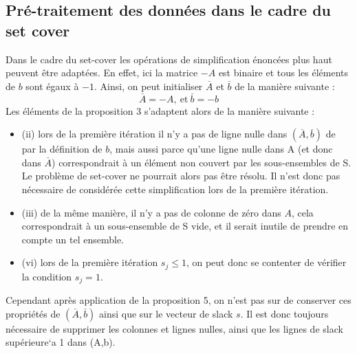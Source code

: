 \documentclass[12pt]{report}
\begin{document}
\subsection{Pré-traitement des données dans le cadre du set cover}

Dans le cadre du set-cover les opérations de simplification énoncées plus haut peuvent être adaptées. En effet, ici la matrice $-A$ est binaire et tous les éléments de $b$ sont égaux à $-1$. Ainsi, on peut initialiser $\overset{\_}{A}$ et $\overset{\_}{b}$ de la manière suivante :
$$
\overset{\_}{A}=-A, \ \mbox{et} \ \overset{\_}{b}=-b
$$
Les éléments de la proposition 3 s'adaptent alors de la manière suivante :
\begin{itemize}
    \item (ii) lors de la première itération il n'y a pas de ligne nulle dans $(\overset{\_}{A},\overset{\_}{b})$ de par la définition de $b$, mais aussi parce qu'une ligne nulle dans A (et donc dans $\overset{\_}{A}$) correspondrait à un élément non couvert par les sous-ensembles de S. Le problème de set-cover ne pourrait alors pas être résolu. Il n'est donc pas nécessaire de considérée cette simplification lors de la première itération.
    \item (iii) de la même manière, il n'y a pas de colonne de zéro dans $A$, cela correspondrait à un sous-ensemble de S vide, et il serait inutile de prendre en compte un tel ensemble.
    \item (vi) lors de la première itération $s_j\le1$, on peut donc se contenter de vérifier la condition $s_j=1$.
\end{itemize}
Cependant après application de la proposition 5, on n'est pas sur de conserver ces propriétés de $(\overset{\_}{A},\overset{\_}{b})$ ainsi que sur le vecteur de slack $s$. Il est donc toujours nécessaire de supprimer les colonnes et lignes nulles, ainsi que les lignes de slack supérieure`a 1 dans (A,b).
\end{document}
